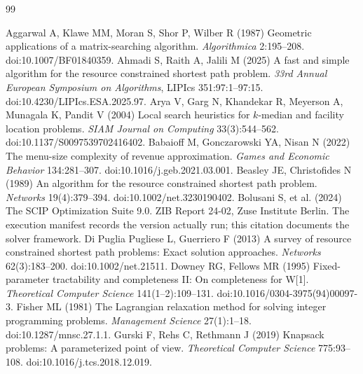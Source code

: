 \documentclass[11pt,letterpaper]{article}
\theoremstyle{definition}\newtheorem{remark}[theorem]{Remark}
\begin{document}
\begin{thebibliography}{99}\raggedright
{}
Aggarwal A, Klawe MM, Moran S, Shor P, Wilber R (1987) Geometric applications of a matrix-searching algorithm. \emph{Algorithmica} 2:195--208. doi:10.1007/BF01840359.
Ahmadi S, Raith A, Jalili M (2025) A fast and simple algorithm for the resource constrained shortest path problem. \emph{33rd Annual European Symposium on Algorithms}, LIPIcs 351:97:1--97:15. doi:10.4230/LIPIcs.ESA.2025.97.
Arya V, Garg N, Khandekar R, Meyerson A, Munagala K, Pandit V (2004) Local search heuristics for $k$-median and facility location problems. \emph{SIAM Journal on Computing} 33(3):544--562. doi:10.1137/S0097539702416402.
Babaioff M, Gonczarowski YA, Nisan N (2022) The menu-size complexity of revenue approximation. \emph{Games and Economic Behavior} 134:281--307. doi:10.1016/j.geb.2021.03.001.
Beasley JE, Christofides N (1989) An algorithm for the resource constrained shortest path problem. \emph{Networks} 19(4):379--394. doi:10.1002/net.3230190402.
Bolusani S, et al. (2024) The SCIP Optimization Suite 9.0. ZIB Report 24-02, Zuse Institute Berlin. The execution manifest records the version actually run; this citation documents the solver framework.
Di Puglia Pugliese L, Guerriero F (2013) A survey of resource constrained shortest path problems: Exact solution approaches. \emph{Networks} 62(3):183--200. doi:10.1002/net.21511.
Downey RG, Fellows MR (1995) Fixed-parameter tractability and completeness II: On completeness for W[1]. \emph{Theoretical Computer Science} 141(1--2):109--131. doi:10.1016/0304-3975(94)00097-3.
Fisher ML (1981) The Lagrangian relaxation method for solving integer programming problems. \emph{Management Science} 27(1):1--18. doi:10.1287/mnsc.27.1.1.
Gurski F, Rehs C, Rethmann J (2019) Knapsack problems: A parameterized point of view. \emph{Theoretical Computer Science} 775:93--108. doi:10.1016/j.tcs.2018.12.019.

\end{thebibliography}
\end{document}

